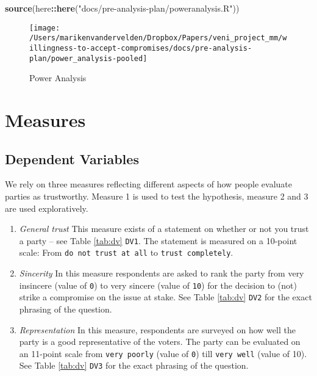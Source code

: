 \documentclass[]{article}
\newenvironment{Shaded}{\begin{snugshade}}{\end{snugshade}}
\newcommand{\KeywordTok}[1]{\textcolor[rgb]{0.13,0.29,0.53}{\textbf{#1}}}
\newcommand{\NormalTok}[1]{#1}
\newcommand{\OperatorTok}[1]{\textcolor[rgb]{0.81,0.36,0.00}{\textbf{#1}}}
\newcommand{\StringTok}[1]{\textcolor[rgb]{0.31,0.60,0.02}{#1}}
\begin{document}
\begin{Shaded}
\begin{Highlighting}[]
\KeywordTok{source}\NormalTok{(here}\OperatorTok{::}\KeywordTok{here}\NormalTok{(}\StringTok{"docs/pre-analysis-plan/poweranalysis.R"}\NormalTok{))}
\end{Highlighting}
\end{Shaded}

\begin{figure}

{\centering \texttt{[image: /Users/marikenvandervelden/Dropbox/Papers/veni\_project\_mm/willingness-to-accept-compromises/docs/pre-analysis-plan/power\_analysis-pooled]} 

}

\caption{\label{fig:power1}Power Analysis}\label{fig:power}
\end{figure}

\hypertarget{measures}{%
\section{Measures}\label{measures}}

\hypertarget{dependent-variables}{%
\subsection{Dependent Variables}\label{dependent-variables}}

We rely on three measures reflecting different aspects of how people
evaluate parties as trustworthy. Measure 1 is used to test the
hypothesis, measure 2 and 3 are used exploratively.

\begin{enumerate}
\def\labelenumi{\arabic{enumi}.}
\item
  \emph{General trust} This measure exists of a statement on whether or
  not you trust a party -- see Table \ref{tab:dv} \texttt{DV1}. The
  statement is measured on a 10-point scale: From
  \texttt{do\ not\ trust\ at\ all} to \texttt{trust\ completely}.
\item
  \emph{Sincerity} In this measure respondents are asked to rank the
  party from very insincere (value of \texttt{0}) to very sincere (value
  of \texttt{10}) for the decision to (not) strike a compromise on the
  issue at stake. See Table \ref{tab:dv} \texttt{DV2} for the exact
  phrasing of the question.
\item
  \emph{Representation} In this measure, respondents are surveyed on how
  well the party is a good representative of the voters. The party can
  be evaluated on an 11-point scale from \texttt{very\ poorly} (value of
  \texttt{0}) till \texttt{very\ well} (value of 10). See Table
  \ref{tab:dv} \texttt{DV3} for the exact phrasing of the question.
\end{enumerate}
\end{document}
